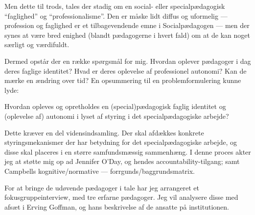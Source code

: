 Men dette til trods, tales der stadig om en social- eller specialpædagogisk “faglighed” og “professionalisme”.
Den er måske lidt diffus og uformelig — profession og faglighed er et tilbagevendende emne i Socialpædagogen — men der synes at være bred enighed (blandt pædagogerne i hvert fald) om at de kan noget særligt og værdifuldt.

Dermed opstår der en række spørgsmål for mig.
Hvordan oplever pædagoger i dag deres faglige identitet?
Hvad er deres oplevelse af professionel autonomi?
Kan de mærke en ændring over tid?
En opsummering til en problemformulering kunne lyde:

Hvordan opleves og opretholdes en (special)pædagogisk faglig identitet og (oplevelse af) autonomi i lyset af styring i det specialpædagogiske arbejde?

Dette kræver en del vidensindsamling.
Der skal afdækkes konkrete styringsmekanismer der har betydning for det specialpædagogiske arbejde, og disse skal placeres i en større samfundsmæssig sammenhæng. I denne proces akter jeg at støtte mig op ad Jennifer O'Day, og hendes accountability-tilgang; samt Campbells kognitive/normative — forrgunds/baggrundsmatrix.

For at bringe de udøvende pædagoger i tale har jeg arrangeret et fokusgruppeinterview, med tre erfarne pædagoger. Jeg vil analysere disse med afsæt i Erving Goffman, og hans beskrivelse af de ansatte på institutionen.


